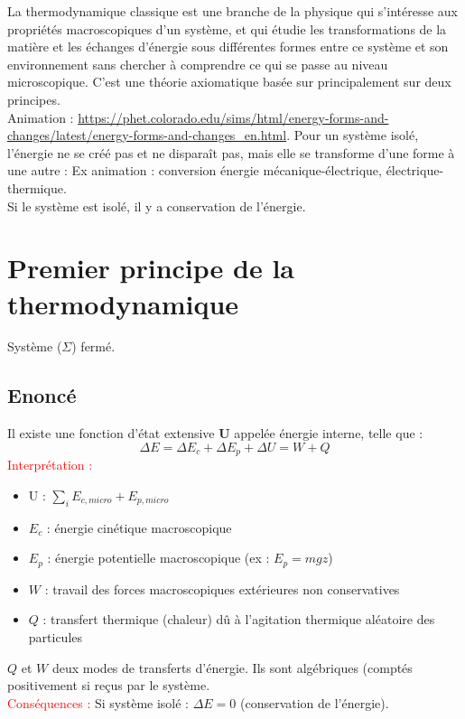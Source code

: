 \documentclass[11pt]{report}
\numberwithin{figure}{section}
\numberwithin{equation}{section}
\numberwithin{table}{section}
\newcommand{\1}{\boldsymbol{1}}
\begin{document}
 La thermodynamique classique est une branche de la physique qui s'intéresse aux propriétés macroscopiques d'un système, et qui étudie les transformations de la matière et les échanges d'énergie sous différentes formes entre ce système et son environnement sans chercher à comprendre ce qui se passe au niveau microscopique. C'est une théorie axiomatique basée sur principalement sur deux principes.\\
  Animation : \url{https://phet.colorado.edu/sims/html/energy-forms-and-changes/latest/energy-forms-and-changes\_en.html}. Pour un système isolé, l'énergie ne se créé pas et ne disparaît pas, mais elle se transforme d'une forme à une autre : Ex animation : conversion énergie mécanique-électrique, électrique-thermique. \\
  Si le système est isolé, il y a conservation de l'énergie. 
  
  
  \section{Premier principe de la thermodynamique}
  Système ($\Sigma$) fermé.
  
  \subsection{Enoncé} Il existe une fonction d'état extensive \textbf{U} appelée énergie interne, telle que : 
  \begin{equation}
      \Delta E = \Delta E_c + \Delta E_p + \Delta U = W + Q
  \end{equation}
  \textcolor{red}{Interprétation :}
  \begin{itemize}
  \item U : $\sum_{i} E_{c,micro} + E_{p,micro}$
  \item $E_c$ : énergie cinétique macroscopique
  \item $E_p$ : énergie potentielle macroscopique (ex : $E_p=mgz$)
  \item $W$ : travail des forces macroscopiques extérieures non conservatives
  \item $Q$ : transfert thermique (chaleur) dû à l'agitation thermique aléatoire des particules
  \end{itemize}
  $Q$ et $W$ deux modes de transferts d'énergie. Ils sont algébriques (comptés positivement si reçus par le système. \\
  
  \textcolor{red}{Conséquences : } Si système isolé : $\Delta E = 0$ (conservation de l'énergie). \\
  
\end{document}
